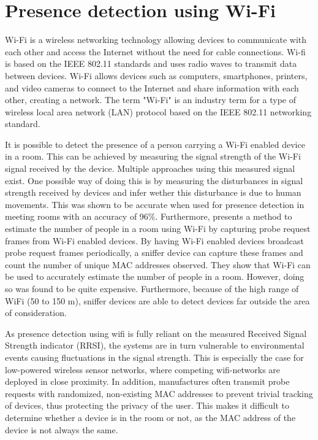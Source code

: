 \section{Presence detection using Wi-Fi} \label{sec:wi-fi}
Wi-Fi is a wireless networking technology allowing devices to communicate with each other and access the Internet without the need for cable connections. 
Wi-fi is based on the IEEE 802.11\cite{iEEE80211} standards and uses radio waves to transmit data between devices.
Wi-Fi allows devices such as computers, smartphones, printers, and video cameras to connect to the Internet and share information with each other, creating a network.
The term "Wi-Fi" is an industry term for a type of wireless local area network (LAN) protocol based on the IEEE 802.11 networking standard.\cite{WiFiAllianceDiscover,CiscoWhatIsWiFi}

It is possible to detect the presence of a person carrying a Wi-Fi enabled device in a room.
This can be achieved by measuring the signal strength of the Wi-Fi signal received by the device.
Multiple approaches using this measured signal exist. 
One possible way of doing this is by measuring the disturbances in signal strength received by devices and infer wether this disturbance is due to human movements. 
This was shown to be accurate when used for presence detection in meeting rooms with an accuracy of 96\%. \cite{wifi_presence_detection_df}
Furthermore,\citeauthor{longoAccurateOccupancyEstimation2019}\cite{longoAccurateOccupancyEstimation2019} presents a method to estimate the number of people in a room using Wi-Fi by capturing probe request frames from Wi-Fi enabled devices.
By having Wi-Fi enabled devices broadcast probe request frames periodically, a sniffer device can capture these frames and count the number of unique MAC addresses observed.
They show that Wi-Fi can be used to accurately estimate the number of people in a room.
However, doing so was found to be quite expensive.
Furthermore, because of the high range of WiFi (50 to 150 m), sniffer devices are able to detect devices far outside the area of consideration.\cite{longoAccurateOccupancyEstimation2019}

As presence detection using wifi is fully reliant on the measured Received Signal Strength indicator (RRSI), the systems are in turn vulnerable to environmental events causing fluctuations in the signal strength.
This is especially the case for low-powered wireless sensor networks, where competing wifi-networks are deployed in close proximity.\cite{competing_wifi}
In addition, manufactures often transmit probe requests with randomized, non-existing MAC addresses to prevent trivial tracking of devices, thus protecting the privacy of the user.
This makes it difficult to determine whether a device is in the room or not, as the MAC address of the device is not always the same.\cite{longoAccurateOccupancyEstimation2019}
